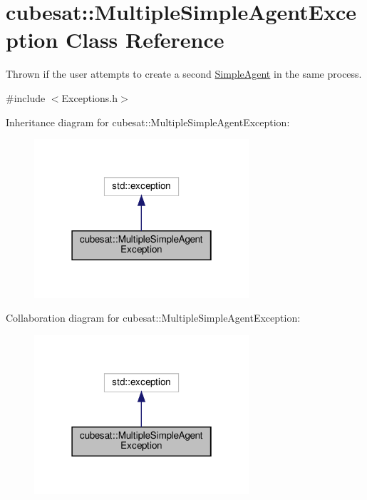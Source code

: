 \hypertarget{classcubesat_1_1MultipleSimpleAgentException}{}\section{cubesat\+:\+:Multiple\+Simple\+Agent\+Exception Class Reference}
\label{classcubesat_1_1MultipleSimpleAgentException}


Thrown if the user attempts to create a second \hyperlink{classcubesat_1_1SimpleAgent}{Simple\+Agent} in the same process.  




{\ttfamily \#include $<$Exceptions.\+h$>$}



Inheritance diagram for cubesat\+:\+:Multiple\+Simple\+Agent\+Exception\+:\nopagebreak
\begin{figure}[H]
\begin{center}
\leavevmode
\includegraphics[width=226pt]{classcubesat_1_1MultipleSimpleAgentException__inherit__graph}
\end{center}
\end{figure}


Collaboration diagram for cubesat\+:\+:Multiple\+Simple\+Agent\+Exception\+:\nopagebreak
\begin{figure}[H]
\begin{center}
\leavevmode
\includegraphics[width=226pt]{classcubesat_1_1MultipleSimpleAgentException__coll__graph}
\end{center}
\end{figure}
